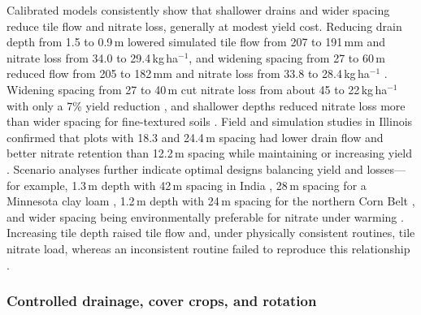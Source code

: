 Calibrated models consistently show that shallower drains and wider spacing reduce tile flow and nitrate loss, generally at modest yield cost. Reducing drain depth from 1.5 to 0.9\,m lowered simulated tile flow from 207 to 191\,mm and nitrate loss from 34.0 to 29.4\,kg\,ha$^{-1}$, and widening spacing from 27 to 60\,m reduced flow from 205 to 182\,mm and nitrate loss from 33.8 to 28.4\,kg\,ha$^{-1}$ \parencite{Moriasi2013}. Widening spacing from 27 to 40\,m cut nitrate loss from about 45 to 22\,kg\,ha$^{-1}$ with only a 7\% yield reduction \parencite{Nangia2010c}, and shallower depths reduced nitrate loss more than wider spacing for fine-textured soils \parencite{Davis2000}. Field and simulation studies in Illinois confirmed that plots with 18.3 and 24.4\,m spacing had lower drain flow and better nitrate retention than 12.2\,m spacing while maintaining or increasing yield \parencite{Hwang2024}. Scenario analyses further indicate optimal designs balancing yield and losses---for example, 1.3\,m depth with 42\,m spacing in India \parencite{Dar2025}, 28\,m spacing for a Minnesota clay loam \parencite{Zhao2000}, 1.2\,m depth with 24\,m spacing for the northern Corn Belt \parencite{Luo2010}, and wider spacing being environmentally preferable for nitrate under warming \parencite{Ziaeifar2025}. Increasing tile depth raised tile flow and, under physically consistent routines, tile nitrate load, whereas an inconsistent routine failed to reproduce this relationship \parencite{Kim2023,Bauwe2016}.

\subsubsection{Controlled drainage, cover crops, and rotation}

